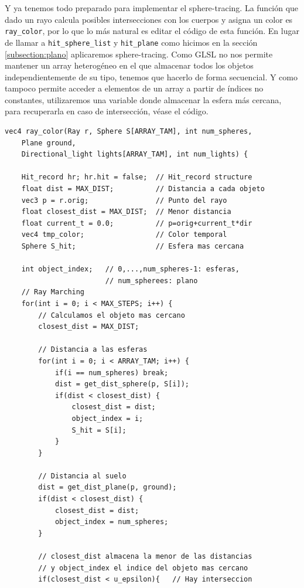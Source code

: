 Y ya tenemos todo preparado para implementar el sphere-tracing. La función que dado un rayo calcula posibles intersecciones con los cuerpos y asigna un color es \verb|ray_color|, por lo que lo más natural es editar el código de esta función. En lugar de llamar a \verb|hit_sphere_list| y \verb|hit_plane| como hicimos en la sección \ref{subsection:plano} aplicaremos sphere-tracing. Como GLSL no nos permite mantener un array heterogéneo en el que almacenar todos los objetos independientemente de su tipo, tenemos que hacerlo de forma secuencial. Y como tampoco permite acceder a elementos de un array a partir de índices no constantes, utilizaremos una variable donde almacenar la esfera más cercana, para recuperarla en caso de intersección, véase el código.

\begin{lstlisting}
vec4 ray_color(Ray r, Sphere S[ARRAY_TAM], int num_spheres, 
    Plane ground,
    Directional_light lights[ARRAY_TAM], int num_lights) {
    
    Hit_record hr; hr.hit = false;  // Hit_record structure
    float dist = MAX_DIST;          // Distancia a cada objeto 
    vec3 p = r.orig;                // Punto del rayo
    float closest_dist = MAX_DIST;  // Menor distancia
    float current_t = 0.0;          // p=orig+current_t*dir
    vec4 tmp_color;                 // Color temporal
    Sphere S_hit;                   // Esfera mas cercana
    
    int object_index;   // 0,...,num_spheres-1: esferas,
                        // num_spherees: plano
    // Ray Marching
    for(int i = 0; i < MAX_STEPS; i++) {
        // Calculamos el objeto mas cercano
        closest_dist = MAX_DIST;

        // Distancia a las esferas
        for(int i = 0; i < ARRAY_TAM; i++) {
            if(i == num_spheres) break;
            dist = get_dist_sphere(p, S[i]);
            if(dist < closest_dist) {
                closest_dist = dist;
                object_index = i;
                S_hit = S[i];
            }
        }

        // Distancia al suelo
        dist = get_dist_plane(p, ground);
        if(dist < closest_dist) {
            closest_dist = dist;
            object_index = num_spheres;
        }
    
        // closest_dist almacena la menor de las distancias
        // y object_index el indice del objeto mas cercano
        if(closest_dist < u_epsilon){   // Hay interseccion


\end{lstlisting}
